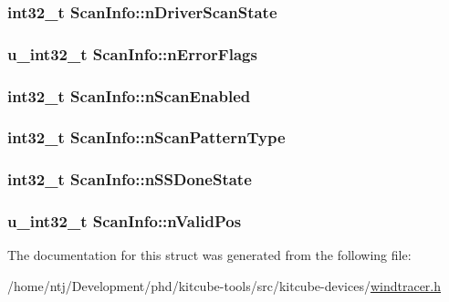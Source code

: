 \hypertarget{structScanInfo_a7cd377a6edb4dfb4ff79d77ee9638bda}{
\subsubsection[{n\-Driver\-Scan\-State}]{\setlength{\rightskip}{0pt plus 5cm}int32\-\_\-t Scan\-Info\-::n\-Driver\-Scan\-State}}\label{structScanInfo_a7cd377a6edb4dfb4ff79d77ee9638bda}
\hypertarget{structScanInfo_a9d77d5adef2042b142b23186dcb0635f}{
\subsubsection[{n\-Error\-Flags}]{\setlength{\rightskip}{0pt plus 5cm}u\-\_\-int32\-\_\-t Scan\-Info\-::n\-Error\-Flags}}\label{structScanInfo_a9d77d5adef2042b142b23186dcb0635f}
\hypertarget{structScanInfo_a633fd4a80d1be23089f0447b24fec5d6}{
\subsubsection[{n\-Scan\-Enabled}]{\setlength{\rightskip}{0pt plus 5cm}int32\-\_\-t Scan\-Info\-::n\-Scan\-Enabled}}\label{structScanInfo_a633fd4a80d1be23089f0447b24fec5d6}
\hypertarget{structScanInfo_a3734fd5525b106f219a16d77440170e4}{
\subsubsection[{n\-Scan\-Pattern\-Type}]{\setlength{\rightskip}{0pt plus 5cm}int32\-\_\-t Scan\-Info\-::n\-Scan\-Pattern\-Type}}\label{structScanInfo_a3734fd5525b106f219a16d77440170e4}
\hypertarget{structScanInfo_a4ad5cbb492f1e6042a54c9c2ea3a48be}{
\subsubsection[{n\-S\-S\-Done\-State}]{\setlength{\rightskip}{0pt plus 5cm}int32\-\_\-t Scan\-Info\-::n\-S\-S\-Done\-State}}\label{structScanInfo_a4ad5cbb492f1e6042a54c9c2ea3a48be}
\hypertarget{structScanInfo_a297a9e4889f6caaffba6d3b9c1a9d1dc}{
\subsubsection[{n\-Valid\-Pos}]{\setlength{\rightskip}{0pt plus 5cm}u\-\_\-int32\-\_\-t Scan\-Info\-::n\-Valid\-Pos}}\label{structScanInfo_a297a9e4889f6caaffba6d3b9c1a9d1dc}


The documentation for this struct was generated from the following file\-:\begin{DoxyCompactItemize}
\item 
/home/ntj/\-Development/phd/kitcube-\/tools/src/kitcube-\/devices/\hyperlink{windtracer_8h}{windtracer.\-h}\end{DoxyCompactItemize}
